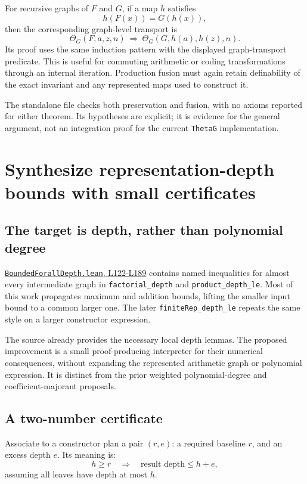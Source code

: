 \documentclass[11pt]{article}
\theoremstyle{remark}\newtheorem{remark}[theorem]{Remark}
\newcommand{\code}[1]{\nolinkurl{#1}}
\newcommand{\ThetaG}{\Theta_G}
\newcommand{\sref}[2]{\href{https://github.com/VladimirReshetnikov/ProveIt/blob/8e8b5dcb954969621c484588f0b902be1cfea7b3/Computability/DiophantineConsistency/Lean/DiophantineConsistency/#1\##2}{\nolinkurl{#1}, #2}}
\begin{document}
For recursive graphs of \(F\) and \(G\), if a map \(h\) satisfies
\[
 h(F(x))=G(h(x)),
\]
then the corresponding graph-level transport is
\[
 \ThetaG(F,a,z,n)\ \Longrightarrow\
 \ThetaG(G,h(a),h(z),n).
\]
Its proof uses the same induction pattern with the displayed graph-transport predicate. This is useful for commuting arithmetic or coding transformations through an internal iteration. Production fusion must again retain definability of the exact invariant and any represented maps used to construct it.

The standalone file checks both preservation and fusion, with no axioms reported for either theorem. Its hypotheses are explicit; it is evidence for the general argument, not an integration proof for the current \code{ThetaG} implementation.

\section{Synthesize representation-depth bounds with small certificates}
\label{sec:depth}

\subsection{The target is depth, rather than polynomial degree}

\sref{BoundedForallDepth.lean}{L122-L189} contains named inequalities for almost every intermediate graph in \code{factorial_depth} and \code{product_depth_le}. Most of this work propagates maximum and addition bounds, lifting the smaller input bound to a common larger one. The later \code{finiteRep_depth_le} repeats the same style on a larger constructor expression.

The source already provides the necessary local depth lemmas. The proposed improvement is a small proof-producing interpreter for their numerical consequences, without expanding the represented arithmetic graph or polynomial expression. It is distinct from the prior weighted polynomial-degree and coefficient-majorant proposals.

\subsection{A two-number certificate}

Associate to a constructor plan a pair \((r,e)\): a required baseline \(r\), and an excess depth \(e\). Its meaning is:
\[
 h\ge r\quad\Longrightarrow\quad \text{result depth}\le h+e,
\]
assuming all leaves have depth at most \(h\).
\end{document}

